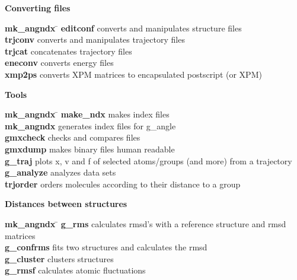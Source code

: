 \begin{description}
\item {\large\bf Converting files}
\vspace{-2ex}\begin{tabbing}
{\bf mk\_angndx} \= \kill
{\bf editconf} \> converts and manipulates structure files \\
{\bf trjconv} \> converts and manipulates trajectory files \\
{\bf trjcat} \> concatenates trajectory files \\
{\bf eneconv} \> converts energy files \\
{\bf xmp2ps} \> converts XPM matrices to encapsulated postscript (or XPM) \\
\end{tabbing}\vspace{-2ex}

\item {\large\bf Tools}
\vspace{-2ex}\begin{tabbing}
{\bf mk\_angndx} \= \kill
{\bf make\_ndx} \> makes index files \\
{\bf mk\_angndx} \> generates index files for g\_angle \\
{\bf gmxcheck} \> checks and compares files \\
{\bf gmxdump} \> makes binary files human readable \\
{\bf g\_traj} \> plots x, v and f of selected atoms/groups (and more) from a trajectory \\
{\bf g\_analyze} \> analyzes data sets \\
{\bf trjorder} \> orders molecules according to their distance to a group \\
\end{tabbing}\vspace{-2ex}

\item {\large\bf Distances between structures}
\vspace{-2ex}\begin{tabbing}
{\bf mk\_angndx} \= \kill
{\bf g\_rms} \> calculates rmsd's with a reference structure and rmsd matrices \\
{\bf g\_confrms} \> fits two structures and calculates the rmsd  \\
{\bf g\_cluster} \> clusters structures \\
{\bf g\_rmsf} \> calculates atomic fluctuations \\
\end{tabbing}\vspace{-2ex}


\end{description}
